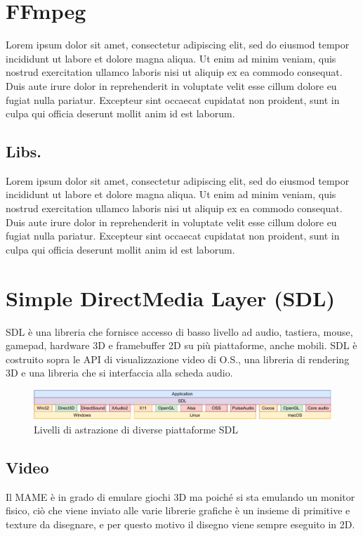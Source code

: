 \section{FFmpeg}
Lorem ipsum dolor sit amet, consectetur adipiscing elit, sed do eiusmod tempor incididunt ut labore et dolore magna aliqua. Ut enim ad minim veniam, quis nostrud exercitation ullamco laboris nisi ut aliquip ex ea commodo consequat. Duis aute irure dolor in reprehenderit in voluptate velit esse cillum dolore eu fugiat nulla pariatur. Excepteur sint occaecat cupidatat non proident, sunt in culpa qui officia deserunt mollit anim id est laborum\cite{FFmpeg_Documentation}.

\subsection{Libs.}
Lorem ipsum dolor sit amet, consectetur adipiscing elit, sed do eiusmod tempor incididunt ut labore et dolore magna aliqua. Ut enim ad minim veniam, quis nostrud exercitation ullamco laboris nisi ut aliquip ex ea commodo consequat. Duis aute irure dolor in reprehenderit in voluptate velit esse cillum dolore eu fugiat nulla pariatur. Excepteur sint occaecat cupidatat non proident, sunt in culpa qui officia deserunt mollit anim id est laborum.



\section{Simple DirectMedia Layer (SDL)}
SDL è una libreria che fornisce accesso di basso livello ad audio, tastiera, mouse, gamepad, hardware 3D e framebuffer 2D su più piattaforme, anche mobili. SDL è costruito sopra le API di visualizzazione video di O.S., una libreria di rendering 3D e una libreria che si interfaccia alla scheda audio\cite{SDL_Wiki}.

\begin{figure}[H]
	\includegraphics[width=\linewidth]{immagini/sdl}
	\caption{Livelli di astrazione di diverse piattaforme SDL}
	\label{fig:sdl}
\end{figure}

\subsection{Video}
Il MAME è in grado di emulare giochi 3D ma poiché si sta emulando un monitor fisico, ciò che viene inviato alle varie librerie grafiche è un insieme di primitive e texture da disegnare, e per questo motivo il disegno viene sempre eseguito in 2D.

